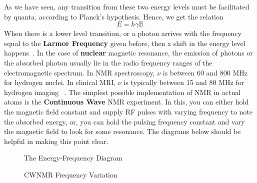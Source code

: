 \documentclass[12pt]{article}
\begin{document}
As we have seen, any transition from these two energy levels must be facilitated by quanta, according to Planck's hypothesis. Hence, we get the relation
$$E = h\gamma\mathbb{B}$$
When there is a lower level transition, or a photon arrives with the frequency equal to the \textbf{Larmor Frequency} given before, then a shift in the energy level happens~\cite{acadml}. In the case of \textbf{nuclear} magnetic resonance, the emission of photons or the absorbed photon usually lie in the radio frequency ranges of the electromagnetic spectrum. In NMR spectroscopy, $\nu$ is between 60 and 800 MHz for hydrogen nuclei. In clinical MRI, $\nu$ is typically between 15 and 80 MHz for hydrogen imaging ~\cite{jph}. The simplest possible implementation of NMR in actual atoms is the \textbf{Continuous Wave} NMR experiment. In this, you can either hold the magnetic field constant and supply RF pulses with varying frequency to note the absorbed energy, or, you can hold the pulsing frequency constant and vary the magnetic field to look for some resonance. The diagrams below should be helpful in making this point clear.

\begin{figure}
\caption{The Energy-Frequency Diagram}
\end{figure}
\begin{figure}
\caption{CWNMR Frequency Variation}
\end{figure}
\clearpage
\end{document}
